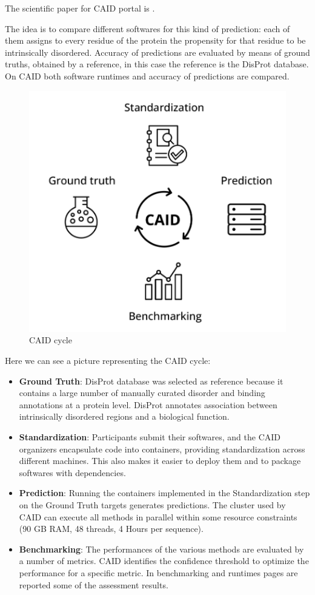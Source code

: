 The scientific paper for CAID portal is \cite{caid}.

The idea is to compare different softwares for this kind of prediction: each of them assigns to every residue of the protein the propensity for that residue to be intrinsically disordered. Accuracy of predictions are evaluated by means of ground truths, obtained by a reference, in this case the reference is the DisProt database. On CAID both software runtimes and accuracy of predictions are compared.

\begin{figure}
    \centering
    \includegraphics[scale=.5]{res/caid_cycle.png}
    \caption{CAID cycle \cite{caid}}
\end{figure}


Here we can see a picture representing the CAID cycle:
\begin{itemize}
    \item \textbf{Ground Truth}: DisProt database was selected as reference because it contains a large number of manually curated disorder and binding annotations at a protein level. DisProt annotates association between intrinsically disordered regions and a biological function.
    \item \textbf{Standardization}: Participants submit their softwares, and the CAID organizers encapsulate code into containers, providing standardization across different machines. This also makes it easier to deploy them and to package softwares with dependencies.
    \item \textbf{Prediction}: Running the containers implemented in the Standardization step on the Ground Truth targets generates predictions. The cluster used by CAID can execute all methods in parallel within some resource constraints (90 GB RAM, 48 threads, 4 Hours per sequence).
    \item \textbf{Benchmarking}: The performances of the various methods are evaluated by a number of metrics. CAID identifies the confidence threshold to optimize the performance for a specific metric. In benchmarking and runtimes pages are reported some of the assessment results.
\end{itemize}

